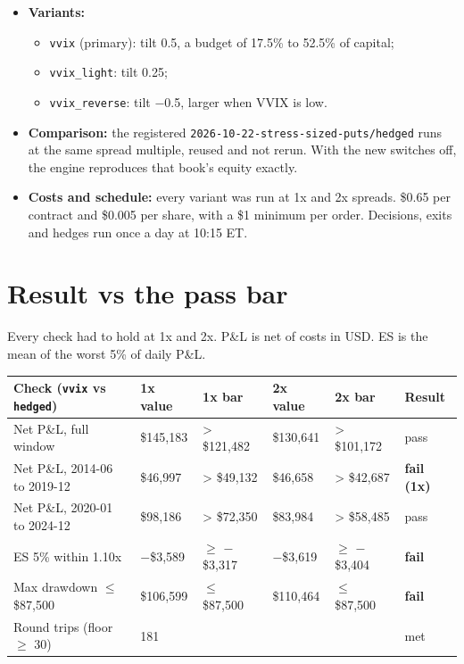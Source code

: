 \documentclass{article}
\begin{document}
\begin{itemize}
\item \textbf{Variants:}

\begin{itemize}

\item \texttt{vvix} (primary): tilt 0.5, a budget of 17.5\% to 52.5\% of capital;

\item \texttt{vvix\_\allowbreak{}light}: tilt 0.25;

\item \texttt{vvix\_\allowbreak{}reverse}: tilt \ensuremath{-}0.5, larger when VVIX is low.

\end{itemize}

\item \textbf{Comparison:} the registered \texttt{2026-\allowbreak{}10-\allowbreak{}22-\allowbreak{}stress-\allowbreak{}sized-\allowbreak{}puts/\allowbreak{}hedged} runs at the same spread multiple, reused and not rerun. With the new switches off, the engine reproduces that book's equity exactly.

\item \textbf{Costs and schedule:} every variant was run at 1x and 2x spreads. \$0.65 per contract and \$0.005 per share, with a \$1 minimum per order. Decisions, exits and hedges run once a day at 10:15 ET.

\end{itemize}

\section{Result vs the pass bar}

Every check had to hold at 1x and 2x. P\&L is net of costs in USD. ES is the mean of the worst 5\% of daily P\&L.

\begin{center}\small
\begin{tabularx}{\linewidth}{>{\raggedright\arraybackslash}X l l l l >{\raggedright\arraybackslash}X}
\toprule
\textbf{Check (\texttt{vvix} vs \texttt{hedged})} & \textbf{1x value} & \textbf{1x bar} & \textbf{2x value} & \textbf{2x bar} & \textbf{Result} \\
\midrule
Net P\&L, full window & \$145,183 & > \$121,482 & \$130,641 & > \$101,172 & pass \\
Net P\&L, 2014-06 to 2019-12 & \$46,997 & > \$49,132 & \$46,658 & > \$42,687 & \textbf{fail (1x)} \\
Net P\&L, 2020-01 to 2024-12 & \$98,186 & > \$72,350 & \$83,984 & > \$58,485 & pass \\
ES 5\% within 1.10x & \ensuremath{-}\$3,589 & \ensuremath{\geq} \ensuremath{-}\$3,317 & \ensuremath{-}\$3,619 & \ensuremath{\geq} \ensuremath{-}\$3,404 & \textbf{fail} \\
Max drawdown \ensuremath{\leq} \$87,500 & \$106,599 & \ensuremath{\leq} \$87,500 & \$110,464 & \ensuremath{\leq} \$87,500 & \textbf{fail} \\
Round trips (floor \ensuremath{\geq} 30) & 181 &  &  &  & met \\
\bottomrule
\end{tabularx}
\end{center}
\end{document}
